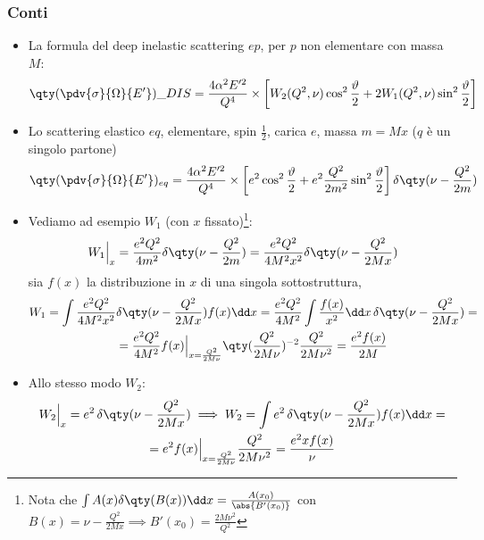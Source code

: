 \subsubsection{Conti}
\begin{itemize}
	\item La formula del deep inelastic scattering $ep$, per $p$ non elementare con massa $M$:
    \begin{equation*}
    \qty(\pdv{\sigma}{\Omega}{E'})\_{DIS}= \frac{4 \alpha^2 E'^2}{Q^4}\times \left[ W_2(Q^2, \nu) \cos^2 \frac{\vartheta}{2} + 2 W_1(Q^2, \nu) \sin^2 \frac{\vartheta}{2} \right] 
    \end{equation*}
    \item Lo scattering elastico $eq$, elementare, spin $\frac{1}{2}$, carica $e$, massa $m=Mx$ ($q$ è un singolo partone)
    \begin{equation*}
        \qty(\pdv{\sigma}{\Omega}{E'})_{eq}= \frac{4 \alpha^2 E'^2}{Q^4}\times \left[ e^2\cos^2\frac{\vartheta}{2}+e^2\frac{Q^2}{2m^2}\sin^2\frac{\vartheta}{2}\right]\delta\qty(\nu-\frac{Q^2}{2m})
    \end{equation*}
    \item Vediamo ad esempio $W_1$ (con $x$ fissato)\footnote{Nota che $\int A(x)\delta\qty(B(x))\dd x=\frac{A(x_0)}{\abs{B'(x_0)}}$ con $B(x)=\nu-\frac{Q^2}{2Mx}\implies B'(x_0)=\frac{2M\nu^2}{Q^2}$}:
    \begin{equation*}
    W_1\Big|_x=\frac{e^2Q^2}{4m^2}\delta\qty(\nu-\frac{Q^2}{2m})=\frac{e^2Q^2}{4M^2x^2}\delta\qty(\nu-\frac{Q^2}{2Mx})
    \end{equation*}
    sia $f(x)$ la distribuzione in $x$ di una singola sottostruttura,
    \begin{gather*}
    W_1=\int \frac{e^2Q^2}{4M^2x^2}\delta\qty(\nu-\frac{Q^2}{2Mx})f(x)\dd x=\frac{e^2Q^2}{4M^2}\int\frac{f(x)}{x^2}\dd x\,\delta\qty(\nu-\frac{Q^2}{2Mx})=\\
    =\frac{e^2Q^2}{4M^2}f(x)\Big|_{x=\frac{Q^2}{2M\nu}}\qty(\frac{Q^2}{2M\nu})^{-2}\frac{Q^2}{2M\nu^2}=\frac{e^2f(x)}{2M}
    \end{gather*}
    \item Allo stesso modo $W_2$:
    \begin{gather*}
    W_2\Big|_x=e^2\,\delta\qty(\nu-\frac{Q^2}{2Mx})\implies W_2=\int e^2\,\delta\qty(\nu-\frac{Q^2}{2Mx})f(x)\dd x=\\
    =e^2f(x)\Big|_{x=\frac{Q^2}{2M\nu}}\frac{Q^2}{2M\nu^2}=\frac{e^2xf(x)}{\nu}
    \end{gather*}
\end{itemize}